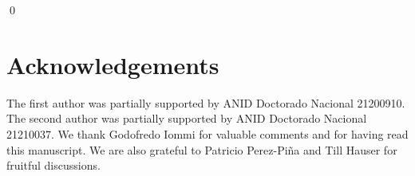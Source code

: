 \documentclass[11pt]{amsart}
\theoremstyle{remark}
\numberwithin{equation}{section}
\begin{document}
\qed 


\section*{Acknowledgements}
The first author was partially supported by ANID Doctorado Nacional 21200910. The second author
was partially supported by ANID Doctorado Nacional 21210037. We thank Godofredo Iommi for valuable comments and for having read this manuscript. We are also grateful to
Patricio Perez-Pi\~{n}a and Till Hauser for fruitful discussions.  



\end{document}
